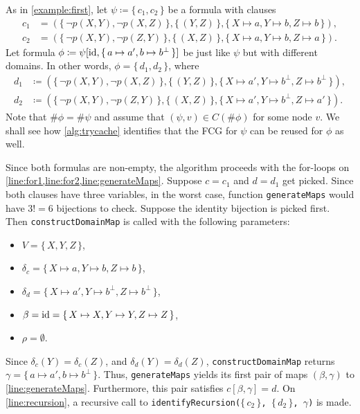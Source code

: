 \begin{example}\label{example}

  As in \cref{example:first}, let $\psi \coloneqq \{\, c_1, c_2 \,\}$ be a
  formula with clauses
  \begin{align*}
    c_1 &= (\{\, \neg p(X, Y), \neg p(X, Z) \,\}, \{\, (Y, Z) \,\}, \{\, X \mapsto a, Y \mapsto b, Z \mapsto b \,\}), \\
    c_2 &= (\{\, \neg p(X, Y), \neg p(Z, Y) \,\}, \{\, (X, Z) \,\}, \{\, X \mapsto a, Y \mapsto b, Z \mapsto a \,\}).
  \end{align*}
  Let formula
  $\phi \coloneqq \psi[\operatorname{id}, \{\, a \mapsto a', b \mapsto b^\bot \,\}]$ be just
  like $\psi$ but with different domains. In other words,
  $\phi = \{\, d_1, d_2 \,\}$, where
  \begin{align*}
    d_1 &\coloneqq (\{\, \neg p(X, Y), \neg p(X, Z) \,\}, \{\, (Y, Z) \,\}, \{\, X \mapsto a', Y \mapsto b^\bot, Z \mapsto b^\bot \,\}),\\
    d_2 &\coloneqq (\{\, \neg p(X, Y), \neg p(Z, Y) \,\}, \{\, (X, Z) \,\}, \{\, X \mapsto a', Y \mapsto b^\bot, Z \mapsto a' \,\}).
  \end{align*}
  Note that $\#\phi = \#\psi$ and assume that $(\psi, v) \in C(\#\phi)$ for some
  node $v$. We shall see how \cref{alg:trycache} identifies that the FCG for
  $\psi$ can be reused for $\phi$ as well.

  Since both formulas are non-empty, the algorithm proceeds with the for-loops
  on \cref{line:for1,line:for2,line:generateMaps}. Suppose $c = c_1$ and
  $d = d_1$ get picked. Since both clauses have three variables, in the worst
  case, function \texttt{generateMaps} would have $3!=6$ bijections to check.
  Suppose the identity bijection is picked first. Then
  \texttt{constructDomainMap} is called with the following parameters:
  \begin{itemize}
    \item $V = \{\, X, Y, Z \,\}$,
    \item $\delta_c = \{\, X \mapsto a, Y \mapsto b, Z \mapsto b \,\}$,
    \item
          $\delta_d = \{\, X \mapsto a', Y \mapsto b^\bot, Z \mapsto b^\bot \,\}$,
    \item $\beta = \operatorname{id} = \{\, X \mapsto X, Y \mapsto Y, Z \mapsto Z \,\}$,
    \item $\rho = \emptyset$.
  \end{itemize}
  Since $\delta_c(Y) = \delta_c(Z)$, and $\delta_d(Y) = \delta_d(Z)$,
  \texttt{constructDomainMap} returns
  $\gamma = \{\, a \mapsto a', b \mapsto b^\bot \,\}$. Thus,
  \texttt{generateMaps} yields its first pair of maps $(\beta, \gamma)$ to
  \cref{line:generateMaps}. Furthermore, this pair satisfies
  $c[\beta, \gamma] = d$. On \cref{line:recursion}, a recursive call to
  \texttt{identifyRecursion($\{\,c_2\,\}$, $\{\,d_2\,\}$, $\gamma$)} is made.


\end{example}
